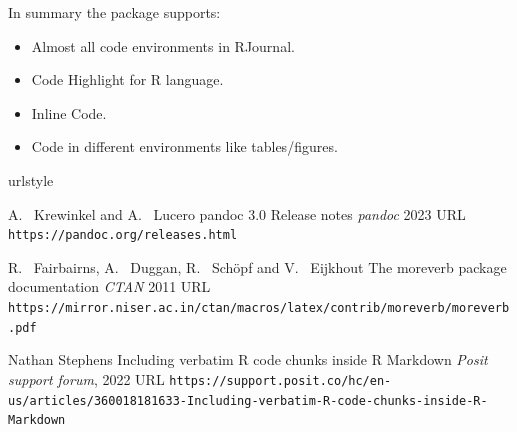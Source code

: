 In summary the  package supports:
\begin{itemize}
\item Almost all code environments in RJournal.
\item Code Highlight for R language.
\item Inline Code.
\item Code in different environments like tables/figures.
\end{itemize}



\begin{thebibliography}{99}
    \providecommand{\natexlab}[1]{#1}
    \providecommand{\url}[1]{\texttt{#1}}
    \expandafter\ifx\csname urlstyle\endcsname\relax
      \providecommand{\doi}[1]{doi: #1}\else
      \providecommand{\doi}{doi: \begingroup \urlstyle{rm}\Url}\fi

A.~ Krewinkel and A.~ Lucero
\newblock pandoc 3.0 Release notes
\newblock \emph{pandoc}  2023
\newblock URL \url{https://pandoc.org/releases.html}

R.~ Fairbairns, A.~ Duggan, R.~ Schöpf and V.~ Eijkhout
\newblock The moreverb package documentation
\newblock \emph{CTAN}  2011
\newblock URL \url{https://mirror.niser.ac.in/ctan/macros/latex/contrib/moreverb/moreverb.pdf}

Nathan Stephens
\newblock Including verbatim R code chunks inside R Markdown
\newblock \emph{Posit support forum}, 2022 
\newblock URL \url{https://support.posit.co/hc/en-us/articles/360018181633-Including-verbatim-R-code-chunks-inside-R-Markdown}
\end{thebibliography}


\address{%
Abhishek Ulayil\\
Student, Institute of Actuaries of India\\%
Mumbai, India\\
ORCiD: 0009-0000-6935-8690\\
}
